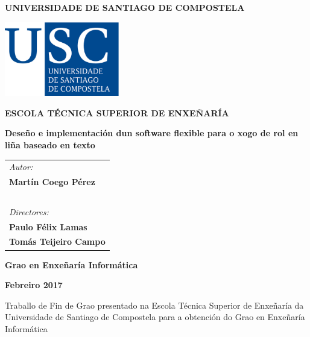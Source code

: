 \pagestyle{empty}
\begin{center}
{\bf\Large UNIVERSIDADE DE SANTIAGO DE COMPOSTELA}

\vspace{0.5cm}
\includegraphics[width=5cm]{figuras/logo_usc.eps}

\vspace{0.5cm}
{\bf\large ESCOLA TÉCNICA SUPERIOR DE ENXEÑARÍA}

\vspace{2cm}
{\bf\LARGE Deseño e implementación dun software flexible para o xogo de rol en liña baseado en texto}

\end{center}

\vspace{2cm}
\hspace{4cm}\begin{tabular}{l}
{\it\Large Autor:} \\
{\bf\Large Martín Coego Pérez} \\
~ \\
{\it\Large Directores:} \\
{\bf\Large Paulo Félix Lamas} \\
{\bf\Large Tomás Teijeiro Campo} \\
\end{tabular}

\vspace{2cm}
\begin{center}
{\bf\Large Grao en Enxeñaría Informática}

\vspace{0.5cm}
{\bf\large Febreiro 2017}

\vspace{0.5cm}
Traballo de Fin de Grao presentado na Escola Técnica Superior de Enxeñaría da
Universidade de Santiago de Compostela para a obtención do Grao en Enxeñaría
Informática
\end{center}

